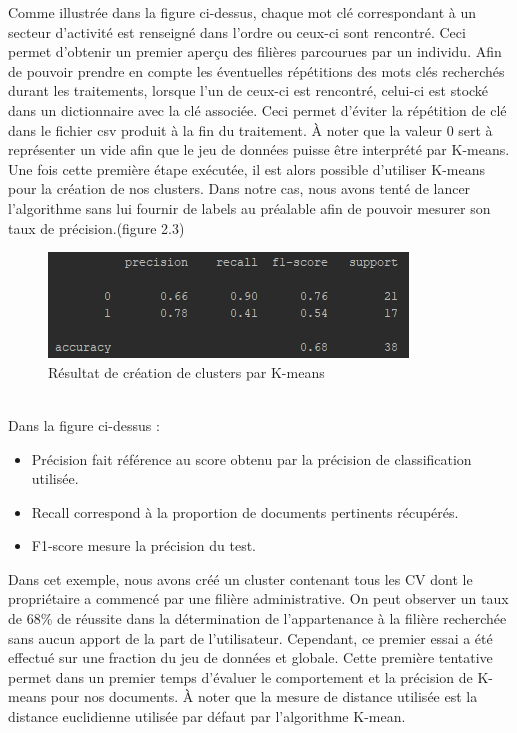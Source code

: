 \documentclass[memoire.tex]{subfiles}
\begin{document}
Comme illustrée dans la figure ci-dessus, chaque mot clé correspondant à un secteur d'activité est renseigné dans l'ordre ou ceux-ci sont rencontré. Ceci permet d'obtenir un premier aperçu des filières parcourues par un individu. Afin de pouvoir prendre en compte les éventuelles répétitions des mots clés recherchés durant les traitements, lorsque l'un de ceux-ci est rencontré, celui-ci est stocké dans un dictionnaire avec la clé associée. Ceci permet d'éviter la répétition de clé dans le fichier csv produit à la fin du traitement. À noter que la valeur 0 sert à représenter un vide afin que le jeu de données puisse être interprété par K-means.\\
Une fois cette première étape exécutée, il est alors possible d'utiliser K-means pour la création de nos clusters. Dans notre cas, nous avons tenté de lancer l'algorithme sans lui fournir de labels au préalable afin de pouvoir mesurer son taux de précision.(figure 2.3)
	\begin{figure}[h!]
		\centerline{\includegraphics[scale=0.7]{img/result_kmeans.png}}
		\caption{Résultat de création de clusters par K-means}
	\end{figure}\\
Dans la figure ci-dessus : \begin{itemize}
\item Précision fait référence au score obtenu par la précision de classification utilisée.
\item Recall correspond à la proportion de documents pertinents récupérés.
\item F1-score mesure la précision du test.
\end{itemize}
Dans cet exemple, nous avons créé un cluster contenant tous les CV dont le propriétaire a commencé par une filière administrative. On peut observer un taux de 68\% de réussite dans la détermination de l'appartenance à la filière recherchée sans aucun apport de la part de l'utilisateur. Cependant, ce premier essai a été effectué sur une fraction du jeu de données et globale. Cette première tentative permet dans un premier temps d'évaluer le comportement et la précision de K-means pour nos documents. À noter que la mesure de distance utilisée est la distance euclidienne utilisée par défaut par l'algorithme K-mean.
\end{document}

